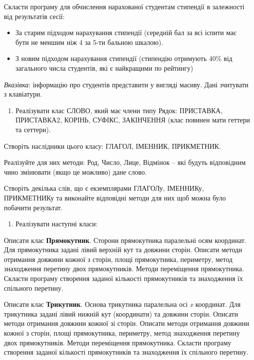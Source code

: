 \documentclass[]{article}
\makeatletter
\newcommand{\xslalph}[1]{\expandafter\@xslalph\csname c@#1\endcsname}
\newcommand{\@xslalph}[1]{%
    \ifcase#1\or а\or б\or в\or г\or д\or e\or є\or ж\or з\or i%
    \or й\or к\or л\or м\or н\or о\or п\or р\or с\or т%
    \or у\or ф\or х\or ц\or ч\or ш\or ю\or я\or аа\or бб\or вв%
    \else\@ctrerr\fi%
}
\makeatother
\begin{document}
\begin{enumerate}
\begin{enumerate}[label=\xslalph*)]
\begin{enumerate}
\begin{enumerate}[label=\xslalph*)]
Скласти програму для обчислення нарахованої студентам стипендії в
залежності від результатів сесії:

\begin{itemize}
\item
  За старим підходом нарахування стипендії (середній бал за всі іспити
  має бути не меншим ніж 4 за 5-ти бальною шкалою).
\item
  З новим підходом нарахування стипендії (стипендію отримують 40\% від
  загального числа студентів, які є найкращими по рейтингу)
\end{itemize}

\emph{\emph{Вказівка}}: інформацію про студентів представити у вигляді
масиву. Дані зчитувати з клавіатури.

\begin{enumerate}
\def\labelenumi{\arabic{enumi})}
\item
  Реалізувати клас СЛОВО, який має члени типу Рядок: ПРИСТАВКА,
  ПРИСТАВКА2, КОРІНЬ, СУФІКС, ЗАКІНЧЕННЯ (клас повинен мати геттери та
  сеттери).
\end{enumerate}

Створіть наслідники цього класу: ГЛАГОЛ, ІМЕННИК, ПРИКМЕТНИК.

Реалізуйте для них методи: Род, Число, Лице, Відмінок -- які будуть
відповідним чино змінювати (якщо це можливо) дане слово.

Створіть декілька слів, що є екземплярами ГЛАГОЛу, ІМЕННИКу, ПРИКМЕТНИКу
та виконайте відповідні методи для них щоб можна було побачити
результат.

\begin{enumerate}
\def\labelenumi{\arabic{enumi})}
\item
  Реалізувати наступні класи:
\end{enumerate}

Описати клас \textbf{Прямокутник}. Сторони прямокутника паралельні осям
координат. Для прямокутника задані лівий верхній кут та довжини сторін.
Описати методи отримання довжини кожної з сторін, площі прямокутника,
периметру, метод знаходження перетину двох прямокутників. Методи
переміщення прямокутника. Скласти програму створення заданої кількості
прямокутників та знаходження їх спільного перетину.

Описати клас \textbf{Трикутник}. Основа трикутника паралельна осі
\emph{x} координат. Для трикутника задані лівий нижній кут (координати)
та довжини сторін. Описати методи отримання довжини кожної зі сторін.
Описати методи отримання довжини кожної з сторін, площі прямокутника,
периметру, метод знаходження перетину двох прямокутників. Методи
переміщення прямокутника. Скласти програму створення заданої кількості
прямокутників та знаходження їх спільного перетину.


\end{enumerate}
\end{enumerate}
\end{enumerate}
\end{enumerate}
\end{document}
